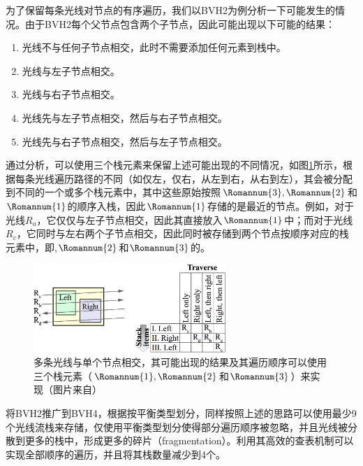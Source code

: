 为了保留每条光线对节点的有序遍历，我们以BVH2为例分析一下可能发生的情况。由于BVH2每个父节点包含两个子节点，因此可能出现以下可能的结果：

\begin{enumerate}
	\item 光线不与任何子节点相交，此时不需要添加任何元素到栈中。
	\item 光线与左子节点相交。
	\item 光线与右子节点相交。
	\item 光线先与左子节点相交，然后与右子节点相交。
	\item 光线先与右子节点相交，然后与左子节点相交。
\end{enumerate}

通过分析，可以使用三个栈元素来保留上述可能出现的不同情况，如图\ref{f:pt-ray-stack-items}所示，根据每条光线遍历路径的不同（如仅左，仅右，从左到右，从右到左），其会被分配到不同的一个或多个栈元素中，其中这些原始按照$\Romannum{3},\Romannum{2}$和$\Romannum{1}$的顺序入栈，因此$\Romannum{1}$存储的是最近的节点。例如，对于光线$R_a$，它仅仅与左子节点相交，因此其直接放入$\Romannum{1}$中；而对于光线$R_c$，它同时与左右两个子节点相交，因此同时被存储到两个节点按顺序对应的栈元素中，即,$\Romannum{2}$和$\Romannum{3}$的。

\begin{figure}
	\sidecaption
	\includegraphics[width=0.65\textwidth]{figures/pt/ray-stack-items}
	\caption{多条光线与单个节点相交，其可能出现的结果及其遍历顺序可以使用三个栈元素（$\Romannum{1},\Romannum{2}$和$\Romannum{3}$）来实现（图片来自\cite{a:DynamicRayStreamTraversal}）}
	\label{f:pt-ray-stack-items}
\end{figure}


将BVH2推广到BVH4，\cite{a:DynamicRayStreamTraversal}根据按平衡类型划分，同样按照上述的思路可以使用最少9个光线流栈来存储，仅使用平衡类型划分使得部分遍历顺序被忽略，并且光线被分散到更多的栈中，形成更多的碎片（fragmentation）。\cite{a:EfficientRayTracingKernelsforModernCPUArchitectures}利用其高效的查表机制可以实现全部顺序的遍历，并且将其栈数量减少到4个。







